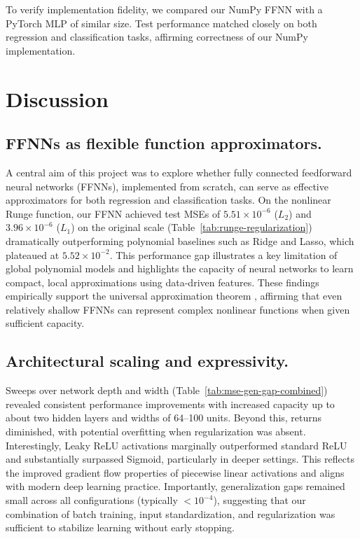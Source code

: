 \documentclass[amssymb,twocolumn,aps]{revtex4}
\begin{document}
To verify implementation fidelity, we compared our NumPy FFNN with a PyTorch MLP of similar size. Test performance matched closely on both regression and classification tasks, affirming correctness of our NumPy implementation.


\section{Discussion}\label{section:discussion}

\subsection{FFNNs as flexible function approximators.}  
A central aim of this project was to explore whether fully connected feedforward neural networks (FFNNs), implemented from scratch, can serve as effective approximators for both regression and classification tasks. On the nonlinear Runge function, our FFNN achieved test MSEs of $5.51\times10^{-6}$ ($L_2$) and $3.96\times10^{-6}$ ($L_1$) on the original scale (Table~\ref{tab:runge-regularization}) dramatically outperforming polynomial baselines such as Ridge and Lasso, which plateaued at $5.52\times10^{-2}$. This performance gap illustrates a key limitation of global polynomial models and highlights the capacity of neural networks to learn compact, local approximations using data-driven features. These findings empirically support the universal approximation theorem \cite{goodfellow2016}, affirming that even relatively shallow FFNNs can represent complex nonlinear functions when given sufficient capacity.

\subsection{Architectural scaling and expressivity.}  
Sweeps over network depth and width (Table~\ref{tab:mse-gen-gap-combined}) revealed consistent performance improvements with increased capacity up to about two hidden layers and widths of 64–100 units. Beyond this, returns diminished, with potential overfitting when regularization was absent. Interestingly, Leaky ReLU activations marginally outperformed standard ReLU and substantially surpassed Sigmoid, particularly in deeper settings. This reflects the improved gradient flow properties of piecewise linear activations and aligns with modern deep learning practice. Importantly, generalization gaps remained small across all configurations (typically $<10^{-4}$), suggesting that our combination of batch training, input standardization, and regularization was sufficient to stabilize learning without early stopping.
\end{document}
